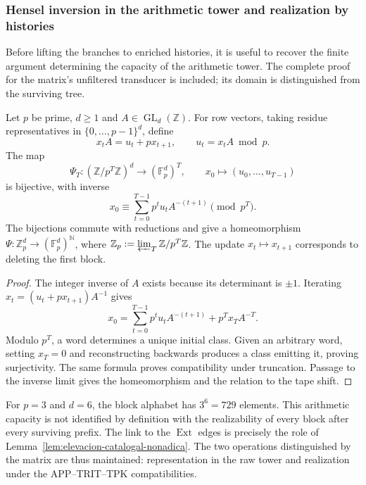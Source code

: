 \subsubsection{Hensel inversion in the arithmetic tower and realization by histories}
\label{sec:ch-capacidad-hensel}

Before lifting the branches to enriched histories, it is useful to recover the
finite argument determining the capacity of the arithmetic tower. The
complete proof for the matrix's unfiltered transducer is
included; its domain is distinguished from the surviving tree.

\begin{proposition}
\label{prop:ch-hensel-bruto}
Let \(p\) be prime, \(d\geq1\) and \(A\in\operatorname{GL}_d(\mathbb Z)\).
For row vectors, taking residue representatives in
\(\{0,\ldots,p-1\}^d\), define
\[
 x_tA=u_t+px_{t+1},\qquad u_t=x_tA\bmod p.
\]
The map
\[
 \Psi_T:(\mathbb Z/p^T\mathbb Z)^d\longrightarrow
             (\mathbb F_p^d)^T,\qquad
 x_0\longmapsto(u_0,\ldots,u_{T-1})
\]
is bijective, with inverse
\[
 x_0\equiv\sum_{t=0}^{T-1}p^tu_tA^{-(t+1)}\pmod{p^T}.
\]
The bijections commute with reductions and give a homeomorphism
\(\Psi:\mathbb Z_p^d\to(\mathbb F_p^d)^{\mathbb N}\), where
\(\mathbb Z_p:=\varprojlim_T\mathbb Z/p^T\mathbb Z\). The update
\(x_t\mapsto x_{t+1}\) corresponds to deleting the first block.
\end{proposition}

\begin{proof}
The integer inverse of \(A\) exists because its determinant is \(\pm1\).
Iterating \(x_t=(u_t+px_{t+1})A^{-1}\) gives
\[
 x_0=\sum_{t=0}^{T-1}p^tu_tA^{-(t+1)}+p^Tx_TA^{-T}.
\]
Modulo \(p^T\), a word determines a unique initial class. Given an
arbitrary word, setting \(x_T=0\) and reconstructing backwards produces a
class emitting it, proving surjectivity. The same formula
proves compatibility under truncation. Passage to the inverse limit gives the
homeomorphism and the relation to the tape shift.
\end{proof}

For \(p=3\) and \(d=6\), the block alphabet has \(3^6=729\)
elements. This arithmetic capacity is not identified by definition with
the realizability of every block after every surviving prefix. The
link to the \(\operatorname{Ext}\) edges is precisely the role
of Lemma~\ref{lem:elevacion-catalogal-nonadica}. The two
operations distinguished by the matrix are thus maintained: representation in the raw tower and
realization under the APP--TRIT--TPK compatibilities.
